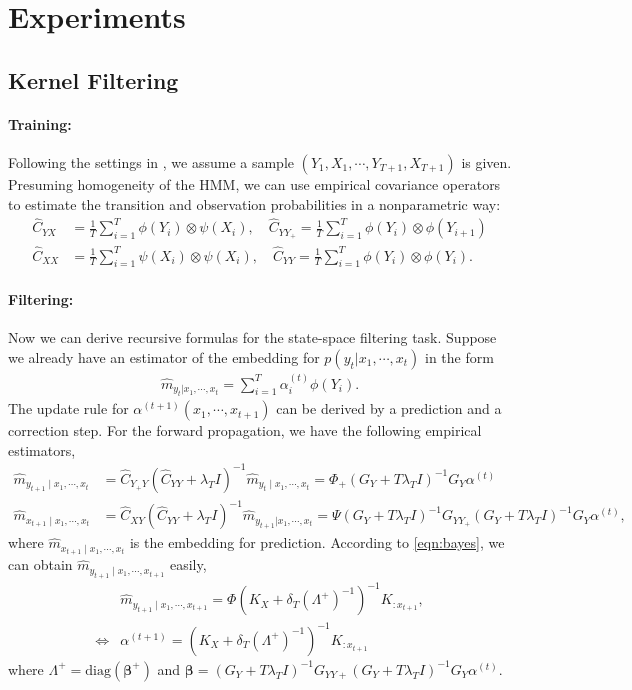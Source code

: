 \documentclass[a4paper]{article}
\newcommand{\up}{\mathrm}
\newcommand{\bs}{\boldsymbol}
\begin{document}
\section{Experiments}
\subsection{Kernel Filtering}
\paragraph{Training:}
Following the settings in \cite{fukumizu2011kernel}, we assume a sample $(Y_1,X_1,\cdots,Y_{T+1},X_{T+1})$ is given. Presuming homogeneity of the HMM, we can use empirical covariance operators to estimate the transition and observation probabilities in a nonparametric way:
\begin{align}
\hat{C}_{YX} &= \frac{1}{T}\sum_{i=1}^T \phi(Y_i)\otimes\psi(X_i),\quad \hat{C}_{YY_+} = \frac{1}{T}\sum_{i=1}^T \phi(Y_{i})\otimes \phi(Y_{i+1})\\
\hat{C}_{XX} &= \frac{1}{T}\sum_{i=1}^T \psi(X_i) \otimes \psi(X_i),\quad \hat{C}_{YY} = \frac{1}{T}\sum_{i=1}^T \phi(Y_i)\otimes\phi(Y_i).
\end{align}
\paragraph{Filtering:}
Now we can derive recursive formulas for the state-space filtering task. Suppose we already have an estimator of the embedding for $p(y_t|x_1,\cdots,x_t)$ in the form
\begin{align}
\hat{m}_{y_t|x_1,\cdots,x_t} = \sum_{i=1}^T \alpha_i^{(t)} \phi(Y_i).
\end{align}
The update rule for $\alpha^{(t+1)}(x_1,\cdots,x_{t+1})$ can be derived by a prediction and a correction step. For the forward propagation, we have the following empirical estimators,
\begin{align}
\hat{m}_{y_{t+1}\mid x_1,\cdots,x_t} &= \hat{C}_{Y_{+}Y}(\hat{C}_{YY}+\lambda_T I)^{-1}\hat{m}_{y_t\mid x_1,\cdots,x_t} = \Phi_{+}(G_Y + T\lambda_T I)^{-1}G_Y \alpha^{(t)}\\
\hat{m}_{x_{t+1}\mid x_1,\cdots,x_t} &= \hat{C}_{XY}(\hat{C}_{YY} + \lambda_{T}I)^{-1}\hat{m}_{y_{t+1}|x_1,\cdots,x_t} = \Psi(G_{Y} + T\lambda_T I)^{-1} G_{YY_+}(G_Y + T\lambda_T I)^{-1}G_{Y} \alpha^{(t)},
\end{align}
where $\hat{m}_{x_{t+1}\mid x_1,\cdots,x_t}$ is the embedding for prediction. According to \eqref{eqn:bayes}, we can obtain $\hat{m}_{y_{t+1}\mid x_1,\cdots,x_{t+1}}$ easily,
\begin{align}
&\hat{m}_{y_{t+1}\mid x_1,\cdots,x_{t+1}} = \Phi(K_X + \delta_T (\Lambda^+)^{-1})^{-1} K_{:x_{t+1}},\\
\Leftrightarrow& \alpha^{(t+1)} = (K_X + \delta_T (\Lambda^+)^{-1})^{-1} K_{:x_{t+1}}
\end{align}
where $\Lambda^+ = \up{diag}(\bs{\beta}^+)$ and $\bs{\beta} = (G_Y + T\lambda_T I)^{-1}G_{YY+}(G_Y + T\lambda_T I)^{-1}G_Y \alpha^{(t)}$.
\end{document}
